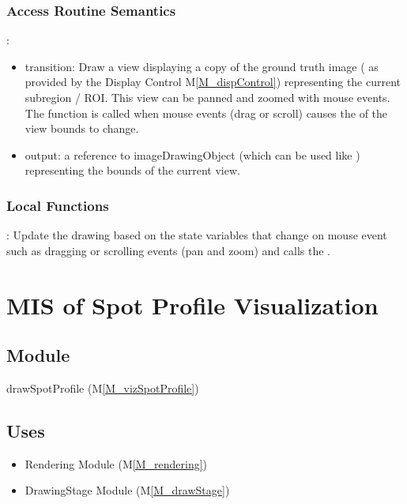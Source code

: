 \documentclass[12pt, titlepage]{article}
\newcommand{\mref}[1]{M\ref{#1}}
\newcommand{\mrefp}[1]{(\mref{#1})}
\newcommand{\mreff}[1]{Module \mrefp{#1}}
\begin{document}
\subsubsection{Access Routine Semantics}

\noindent {}:
\begin{itemize}
\item transition: Draw a view displaying a copy of the ground truth image
  ( as provided by the Display Control \mref{M_dispControl})
  representing the current subregion / ROI.
  This view can be panned and zoomed with mouse events.
  The  function is called when mouse events (drag or scroll)
  causes the of the view bounds to change.
\item output: a reference to  imageDrawingObject
  (which can be used like ) representing the bounds of the current view.
\end{itemize}

\subsubsection{Local Functions}
: Update the drawing based on the state variables that change on mouse event
  such as dragging or scrolling events (pan and zoom) and calls the .

\newpage




\section{MIS of Spot Profile Visualization} \label{MS_vizSpotProfile}

\subsection{Module}
drawSpotProfile \mrefp{M_vizSpotProfile}

\subsection{Uses}
\begin{itemize}
  \item Rendering \mreff{M_rendering}
  \item DrawingStage \mreff{M_drawStage}
\end{itemize}
\end{document}
